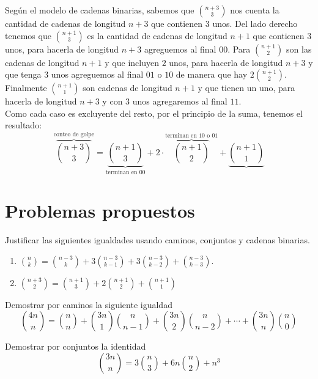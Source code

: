 \begin{solucion}
    Según el modelo de cadenas binarias, sabemos que $\displaystyle\binom{n+3}{3}$ nos cuenta la cantidad de cadenas de longitud $n+3$ que contienen $3$ unos. Del lado derecho tenemos que $\displaystyle\binom{n+1}{3}$ es la cantidad de cadenas de longitud $n+1$ que contienen $3$ unos, para hacerla de longitud $n+3$ agreguemos al final $00$. Para $\displaystyle\binom{n+1}{2}$ son las
cadenas de longitud $n+1$ y que incluyen $2$ unos, para hacerla de longitud $n+3$ y que tenga $3$ unos agreguemos al final $01$ o $10$ de manera que hay $\displaystyle 2\binom{n+1}{2}$. Finalmente $\displaystyle \binom{n+1}{1}$ son cadenas de longitud $n+1$ y que tienen un uno, para hacerla de longitud $n+3$ y con $3$ unos agregaremos al final $11$.\\
Como cada caso es excluyente del resto, por el principio de la suma, tenemos el resultado:
\[\overbrace{\binom{n+3}{3}}^{\text{conteo de golpe}}=\underbrace{\binom{n+1}{3}}_{\text{terminan en $00$}}+2\cdot \overbrace{\binom{n+1}{2}}^{\text{terminan en $10$ o $01$}}+\underbrace{\binom{n+1}{1}}\]
\end{solucion}

\section{Problemas propuestos}
\begin{problema}
    Justificar las siguientes igualdades usando caminos, conjuntos y cadenas binarias.
\begin{enumerate}
    \item \( \displaystyle \binom{n}{k} = \binom{n-3}{k} + 3\binom{n-3}{k-1} + 3\binom{n-3}{k-2} + \binom{n-3}{k-3} \).
    \item \( \displaystyle \binom{n+3}{2} = \binom{n+1}{3} + 2\binom{n+1}{2} + \binom{n+1}{1} \)
\end{enumerate}
\end{problema}

\begin{problema}
    Demostrar por caminos la siguiente igualdad
\[ \binom{4n}{n} = \binom{n}{n} + \binom{3n}{1}\binom{n}{n-1} + \binom{3n}{2}\binom{n}{n-2} + \cdots + \binom{3n}{n}\binom{n}{0} \]

\end{problema}

\begin{problema}
Demostrar por conjuntos la identidad
\[ \binom{3n}{n} = 3\binom{n}{3} + 6n\binom{n}{2} + n^3 \]
\end{problema}

